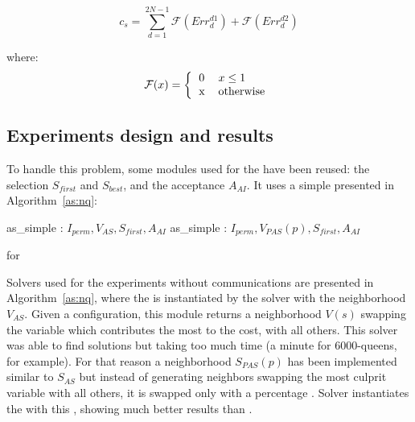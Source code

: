 \begin{equation}\label{func:cost_nqp}
c_s=\sum_{d=1}^{2N-1}{\mathcal{F}(Err^{d1}_{d}) + \mathcal{F}(Err^{d2}_{d})}
\end{equation}

where:
\begin{equation*}
\mathcal{F}(x)=\left\{
\begin{tabular}{ll}
0 & $x \leq 1$ \\
x & otherwise
\end{tabular}
\right.
\end{equation*}

\subsection{Experiments design and results}

To handle this problem, some modules used for the \sgp{} have been reused: the selection \oms{} $S_{first}$ and $S_{best}$, and the acceptance \om{} $A_{AI}$. It uses a simple \as{} presented in Algorithm~\ref{as:nq}:

\begin{algorithm}[H]
\dontprintsemicolon
\SetNoline
{}
   as\_simple\;
\algoindent {} : $I_{perm}, V_{AS}, S_{first}, A_{AI}$ \;
   as\_simple\;
\algoindent {} : $I_{perm}, V_{PAS}(p), S_{first}, A_{AI}$ \; 
\caption{\As{} for \NQP}\label{as:nq}
\end{algorithm}

Solvers used for the experiments without communications are presented in Algorithm~\ref{as:nq}, where the \as{} is instantiated by the solver  with the neighborhood \om{} $V_{AS}$. Given a configuration, this module returns a neighborhood $V\left(s\right)$ swapping the variable which contributes the most to the cost, with all others. This solver was able to find solutions but taking too much time (a minute for 6000-queens, for example). For that reason a neighborhood \om{} $S_{PAS}(p)$ has been implemented similar to $S_{AS}$ but instead of generating neighbors swapping the most culprit variable with all others, it is swapped only with a percentage . Solver  instantiates the \as{} with this \om, showing much better results than .

